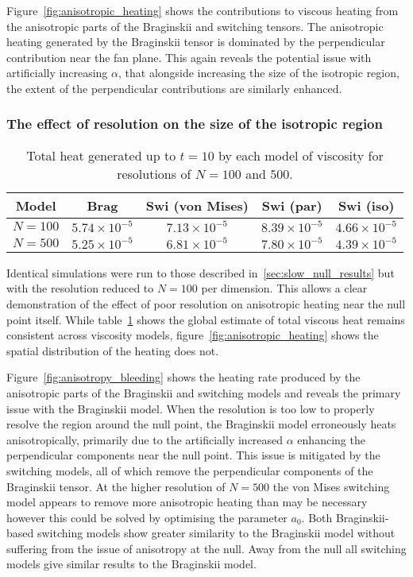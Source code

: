 Figure~\ref{fig:anisotropic_heating} shows the contributions to viscous heating from the anisotropic parts of the Braginskii and switching tensors. The anisotropic heating generated by the Braginskii tensor is dominated by the perpendicular contribution near the fan plane. This again reveals the potential issue with artificially increasing $\alpha$, that alongside increasing the size of the isotropic region, the extent of the perpendicular contributions are similarly enhanced.

\subsubsection{The effect of resolution on the size of the isotropic region}

\begin{table}[t]
  \centering
  \caption{Total heat generated up to $t=10$ by each model of viscosity for resolutions of $N=100$ and $500$.}
  \label{tab:slow_null_results_resolution}
  \begin{tabular}{c|cccc}
Model &  Brag & Swi (von Mises) & Swi (par) & Swi (iso)\\
\midrule
$N=100$ &  $5.74 \times 10^{-5}$ & $7.13 \times 10^{-5}$ & $8.39 \times 10^{-5}$ & $4.66 \times 10^{-5}$\\
$N=500$   & $5.25 \times 10^{-5}$ & $6.81 \times 10^{-5}$ & $7.80 \times 10^{-5}$ & $4.39 \times 10^{-5}$  \end{tabular}
\end{table}

Identical simulations were run to those described in~\ref{sec:slow_null_results} but with the resolution reduced to $N=100$ per dimension. This allows a clear demonstration of the effect of poor resolution on anisotropic heating near the null point itself. While table~\ref{tab:slow_null_results_resolution} shows the global estimate of total viscous heat remains consistent across viscosity models, figure~\ref{fig:anisotropic_heating} shows the spatial distribution of the heating does not.

Figure~\ref{fig:anisotropy_bleeding} shows the heating rate produced by the anisotropic parts of the Braginskii and switching models and reveals the primary issue with the Braginskii model. When the resolution is too low to properly resolve the region around the null point, the Braginskii model erroneously heats anisotropically, primarily due to the artificially increased $\alpha$ enhancing the perpendicular components near the null point. This issue is mitigated by the switching models, all of which remove the perpendicular components of the Braginskii tensor. At the higher resolution of $N=500$ the von Mises switching model appears to remove more anisotropic heating than may be necessary however this could be solved by optimising the parameter $a_0$. Both Braginskii-based switching models show greater similarity to the Braginskii model without suffering from the issue of anisotropy at the null. Away from the null all switching models give similar results to the Braginskii model.

